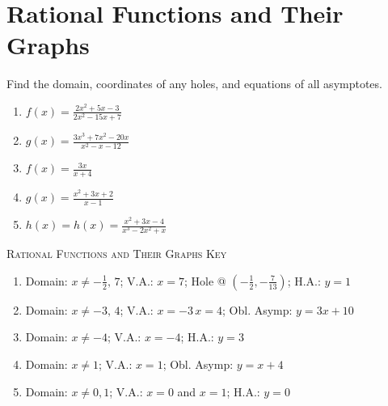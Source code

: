 \chapter{Rational Functions and Their Graphs}

Find the domain, coordinates of any holes, and equations of all asymptotes.
\begin{enumerate}
\setlength\itemsep{10pt}
	\item $f(x) = \frac{2x^2+5x-3}{2x^2-15x+7}$
	\item $g(x) = \frac{3x^3+7x^2-20x}{x^2-x-12}$
	\item $f(x) = \frac{3x}{x+4}$
	\item $g(x) = \frac{x^2+3x+2}{x-1}$
	\item $h(x) = h(x) = \frac{x^2+3x-4}{x^3-2x^2+x}$
\end{enumerate}

\newpage

\textsc{Rational Functions and Their Graphs Key}

\begin{enumerate}
    \item Domain: $x \neq -\frac{1}{2}, \, 7$; V.A.: $x=7$; Hole @ $\left(-\frac{1}{2},-\frac{7}{13}\right)$; H.A.: $y=1$
    \item Domain: $x \neq -3, \, 4$; V.A.: $x=-3 \, x = 4$; Obl. Asymp: $y = 3x+10$
    \item Domain: $x \neq -4$; V.A.: $x = -4$; H.A.: $y = 3$
    \item Domain: $x \neq 1$; V.A.: $x = 1$; Obl. Asymp: $y = x + 4$
    \item Domain: $x \neq 0, 1$; V.A.: $x = 0$ and $x = 1$; H.A.: $y = 0$ 
\end{enumerate}
